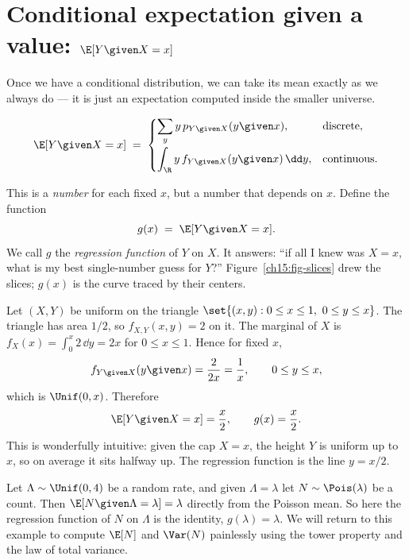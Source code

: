 \section{Conditional expectation given a value: \texorpdfstring{$\E[Y \given X = x]$}{E[Y|X=x]}}
\label{ch15:cond-exp-value}

Once we have a conditional distribution, we can take its mean exactly as we always do --- it is just
an expectation computed inside the smaller universe.

\begin{definition}[Conditional expectation given $X = x$]
\label{ch15:def-cond-exp-value}
\[
  \E[Y \given X = x] \;=\;
  \begin{cases}
    \displaystyle\sum_y y \, p_{Y\given X}(y \given x), & \text{discrete},\\[1.2em]
    \displaystyle\int_\R y \, f_{Y\given X}(y \given x)\,\dd y, & \text{continuous}.
  \end{cases}
\]
\end{definition}

This is a \emph{number} for each fixed $x$, but a number that depends on $x$. Define the function
\[
  g(x) \;=\; \E[Y \given X = x].
\]
We call $g$ the \emph{regression function} of $Y$ on $X$. It answers: ``if all I knew was $X = x$,
what is my best single-number guess for $Y$?'' Figure~\ref{ch15:fig-slices} drew the slices; $g(x)$ is
the curve traced by their centers.

\begin{example}
\label{ch15:ex-triangle}
Let $(X,Y)$ be uniform on the triangle $\set{(x,y) : 0 \le x \le 1,\ 0 \le y \le x}$. The triangle has
area $1/2$, so $f_{X,Y}(x,y) = 2$ on it. The marginal of $X$ is
$f_X(x) = \int_0^x 2 \,\dd y = 2x$ for $0 \le x \le 1$. Hence for fixed $x$,
\[
  f_{Y\given X}(y \given x) = \frac{2}{2x} = \frac{1}{x}, \qquad 0 \le y \le x,
\]
which is $\Unif(0,x)$. Therefore
\[
  \E[Y \given X = x] = \frac{x}{2}, \qquad g(x) = \frac{x}{2}.
\]
This is wonderfully intuitive: given the cap $X = x$, the height $Y$ is uniform up to $x$, so on
average it sits halfway up. The regression function is the line $y = x/2$.
\end{example}

\begin{example}
\label{ch15:ex-poisson-rate}
Let $\Lambda \sim \Unif(0, 4)$ be a random rate, and given $\Lambda = \lambda$ let $N \sim \Pois(\lambda)$
be a count. Then $\E[N \given \Lambda = \lambda] = \lambda$ directly from the Poisson mean. So here the
regression function of $N$ on $\Lambda$ is the identity, $g(\lambda) = \lambda$. We will return to this
example to compute $\E[N]$ and $\Var(N)$ painlessly using the tower property and the law of total
variance.
\end{example}

